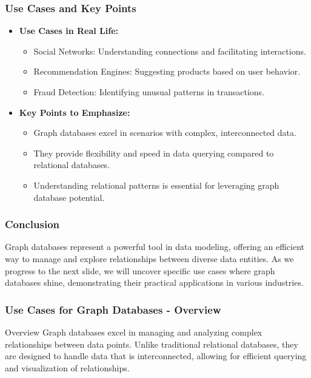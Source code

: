 \documentclass[aspectratio=169]{beamer}
\begin{document}
\begin{frame}[fragile]
    \frametitle{Use Cases and Key Points}
    \begin{itemize}
        \item \textbf{Use Cases in Real Life:}
        \begin{itemize}
            \item Social Networks: Understanding connections and facilitating interactions.
            \item Recommendation Engines: Suggesting products based on user behavior.
            \item Fraud Detection: Identifying unusual patterns in transactions.
        \end{itemize}
        
        \item \textbf{Key Points to Emphasize:}
        \begin{itemize}
            \item Graph databases excel in scenarios with complex, interconnected data.
            \item They provide flexibility and speed in data querying compared to relational databases.
            \item Understanding relational patterns is essential for leveraging graph database potential.
        \end{itemize}
    \end{itemize}
\end{frame}

\begin{frame}[fragile]
    \frametitle{Conclusion}
    Graph databases represent a powerful tool in data modeling, offering an efficient way to manage and explore relationships between diverse data entities. 
    As we progress to the next slide, we will uncover specific use cases where graph databases shine, demonstrating their practical applications in various industries.
\end{frame}

\begin{frame}[fragile]
    \frametitle{Use Cases for Graph Databases - Overview}
    \begin{block}{Overview}
        Graph databases excel in managing and analyzing complex relationships between data points. Unlike traditional relational databases, they are designed to handle data that is interconnected, allowing for efficient querying and visualization of relationships.
    \end{block}
\end{frame}
\end{document}
